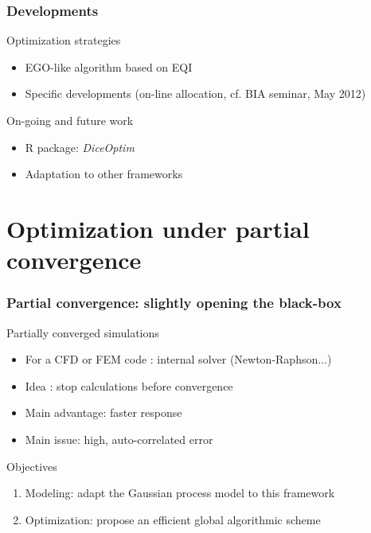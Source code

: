 \documentclass[10pt]{beamer}
\begin{document}
\frame
{
\frametitle{Developments}
\begin{block}{Optimization strategies}
\begin{itemize}
	\item EGO-like algorithm based on EQI
	\item Specific developments (on-line allocation, cf. BIA seminar, May 2012)
\end{itemize}
\end{block}

\begin{block}{On-going and future work}
\begin{itemize}
    \item R package: \textit{DiceOptim}
    \item Adaptation to other frameworks
\end{itemize}
\end{block}
}

\section{Optimization under partial convergence}

\frame
{
\frametitle{Partial convergence: slightly opening the black-box}

\begin{block}{Partially converged simulations}
\begin{itemize}
 \item For a CFD or FEM code : internal solver (Newton-Raphson...)
 \item Idea : stop calculations before convergence
 \item Main advantage: faster response
 \item Main issue: high, auto-correlated error
\end{itemize}

\begin{block}{Objectives}
\begin{enumerate}
 \item Modeling: adapt the Gaussian process model to this framework
 \item Optimization: propose an efficient global algorithmic scheme
\end{enumerate}
\end{block}

\end{block}
}
\end{document}
